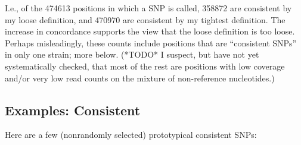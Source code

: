 \documentclass{article}\usepackage[]{graphicx}\usepackage[]{color}
\begin{document}
\noindent I.e., of the 474613 positions in which a SNP is called, 358872 are
consistent by my loose definition, and 470970 are consistent by my tightest definition.  The
increase in concordance supports the view that the loose definition is too loose.  Perhaps misleadingly, these counts
include positions that are ``consistent SNPs'' in only one strain; more below.  (*TODO* I suspect, but have not yet
systematically checked, that most of the rest are positions with low coverage and/or very low read counts on the mixture
of non-reference nucleotides.)

\subsection{Examples: Consistent}
Here are a few (nonrandomly selected) prototypical consistent SNPs:
\end{document}
